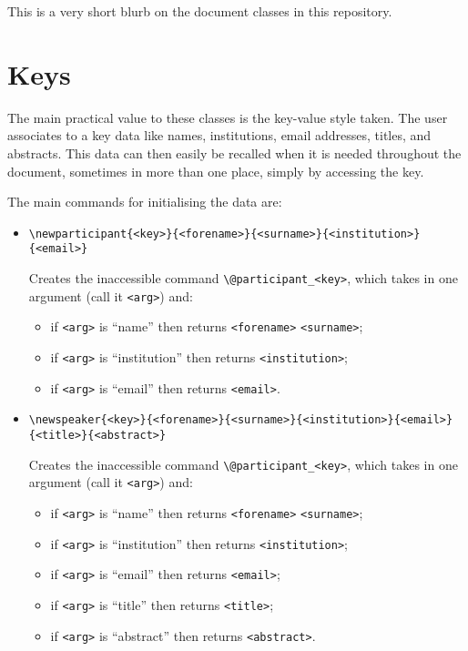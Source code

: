 \documentclass{amsart}
\begin{document}
This is a very short blurb on the document classes in this repository.

\section{Keys}
The main practical value to these classes is the key-value style taken.  The user associates to a key data like names, institutions, email addresses, titles, and abstracts.  This data can then easily be recalled when it is needed throughout the document, sometimes in more than one place, simply by accessing the key.

The main commands for initialising the data are:
\begin{itemize}
    \item \verb|\newparticipant{<key>}{<forename>}{<surname>}{<institution>}{<email>}|

    Creates the inaccessible command \verb|\@participant_<key>|, which takes in one argument (call it \verb|<arg>|) and:
    \begin{itemize}
        \item if \verb|<arg>| is ``name'' then returns \verb|<forename>| \verb|<surname>|;
        \item if \verb|<arg>| is ``institution'' then returns \verb|<institution>|;
        \item if \verb|<arg>| is ``email'' then returns \verb|<email>|.
    \end{itemize}
    \item \verb|\newspeaker{<key>}{<forename>}{<surname>}{<institution>}{<email>}{<title>}{<abstract>}|

    Creates the inaccessible command \verb|\@participant_<key>|, which takes in one argument (call it \verb|<arg>|) and:
    \begin{itemize}
        \item if \verb|<arg>| is ``name'' then returns \verb|<forename>| \verb|<surname>|;
        \item if \verb|<arg>| is ``institution'' then returns \verb|<institution>|;
        \item if \verb|<arg>| is ``email'' then returns \verb|<email>|;
        \item if \verb|<arg>| is ``title'' then returns \verb|<title>|;
        \item if \verb|<arg>| is ``abstract'' then returns \verb|<abstract>|.
    \end{itemize}
\end{itemize}
\end{document}
